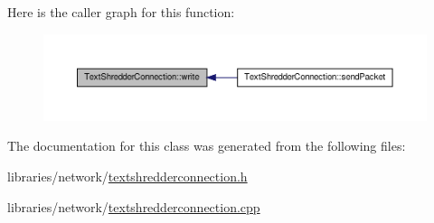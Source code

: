 Here is the caller graph for this function:\nopagebreak
\begin{figure}[H]
\begin{center}
\leavevmode
\includegraphics[width=400pt]{class_text_shredder_connection_acf1e4260675c90dde5c2bd9a16907863_icgraph}
\end{center}
\end{figure}




The documentation for this class was generated from the following files:\begin{DoxyCompactItemize}
\item 
libraries/network/\hyperlink{textshredderconnection_8h}{textshredderconnection.h}\item 
libraries/network/\hyperlink{textshredderconnection_8cpp}{textshredderconnection.cpp}\end{DoxyCompactItemize}
